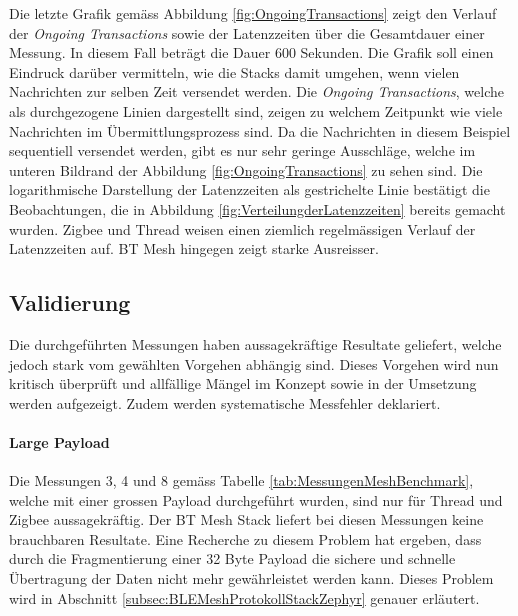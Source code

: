 Die letzte Grafik gemäss Abbildung \ref{fig:OngoingTransactions} zeigt den Verlauf der \textit{Ongoing Transactions} sowie der Latenzzeiten über die Gesamtdauer einer Messung.
In diesem Fall beträgt die Dauer 600 Sekunden.
Die Grafik soll einen Eindruck darüber vermitteln, wie die Stacks damit umgehen, wenn vielen Nachrichten zur selben Zeit versendet werden.
Die \textit{Ongoing Transactions}, welche als durchgezogene Linien dargestellt sind, zeigen zu welchem Zeitpunkt wie viele Nachrichten im Übermittlungsprozess sind.
Da die Nachrichten in diesem Beispiel sequentiell versendet werden, gibt es nur sehr geringe Ausschläge, welche im unteren Bildrand der Abbildung \ref{fig:OngoingTransactions} zu sehen sind.
Die logarithmische Darstellung der Latenzzeiten als gestrichelte Linie bestätigt die Beobachtungen, die in Abbildung  \ref{fig:VerteilungderLatenzzeiten} bereits gemacht wurden.
Zigbee und Thread weisen einen ziemlich regelmässigen Verlauf der Latenzzeiten auf.
BT Mesh hingegen zeigt starke Ausreisser.

\subsection{Validierung}\label{subsec:Validierung}
Die durchgeführten Messungen haben aussagekräftige Resultate geliefert, welche jedoch stark vom gewählten Vorgehen abhängig sind.
Dieses Vorgehen wird nun kritisch überprüft und allfällige Mängel im Konzept sowie in der Umsetzung werden aufgezeigt.
Zudem werden systematische Messfehler deklariert.

\paragraph{Large Payload}
Die Messungen 3, 4 und 8 gemäss Tabelle \ref{tab:MessungenMeshBenchmark}, welche mit einer grossen Payload durchgeführt wurden, sind nur für Thread und Zigbee aussagekräftig. Der BT Mesh Stack liefert bei diesen Messungen keine brauchbaren Resultate.
Eine Recherche zu diesem Problem hat ergeben, dass durch die Fragmentierung einer 32 Byte Payload die sichere und schnelle Übertragung der Daten nicht mehr gewährleistet werden kann. Dieses Problem wird in Abschnitt \ref{subsec:BLEMeshProtokollStackZephyr} genauer erläutert.

